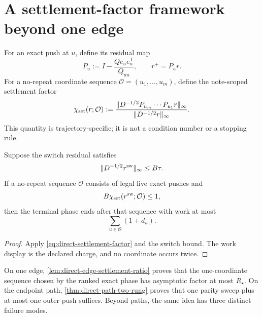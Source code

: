 \section{A settlement-factor framework beyond one edge}
\label{sec:direct-settlement-framework}

For an exact push at $u$, define its residual map
\begin{equation}
 P_u:=I-\frac{Qe_ue_u^\mathsf T}{Q_{uu}},
 \qquad r^+=P_ur.
 \label{eq:direct-exact-residual-map}
\end{equation}
For a no-repeat coordinate sequence
$\mathcal O=(u_1,\ldots,u_m)$, define the note-scoped settlement factor
\begin{equation}
 \chi_{\rm set}(r;\mathcal O)
 :=\frac{
   \lVert D^{-1/2}P_{u_m}\cdots P_{u_1}r\rVert_\infty
 }{\lVert D^{-1/2}r\rVert_\infty}.
 \label{eq:direct-settlement-factor}
\end{equation}
This quantity is trajectory-specific; it is not a condition number or a
stopping rule.

\begin{proposition}
\label{prop:direct-one-pass-certificate}
Suppose the switch residual satisfies
\begin{equation*}
 \lVert D^{-1/2}r^{\rm sw}\rVert_\infty\leq B\tau.
\end{equation*}
If a no-repeat sequence
$\mathcal O$ consists of legal live exact pushes and
\begin{equation}
 B\chi_{\rm set}(r^{\rm sw};\mathcal O)\leq1,
 \label{eq:direct-one-pass-condition}
\end{equation}
then the terminal phase ends after that sequence with work at most
\begin{equation}
 \sum_{u\in\mathcal O}(1+d_u).
 \label{eq:direct-one-pass-work}
\end{equation}
\end{proposition}

\begin{proof}
Apply \cref{eq:direct-settlement-factor} and the switch bound. The work
display is the declared charge, and no coordinate occurs twice.
\end{proof}

On one edge, \cref{lem:direct-edge-settlement-ratio} proves that the
one-coordinate sequence chosen by the ranked exact phase has asymptotic
factor at most $R_\star$. On the endpoint path,
\cref{thm:direct-path-two-rung} proves that one parity sweep plus at most one
outer push suffices. Beyond paths, the same idea has three distinct failure
modes.

